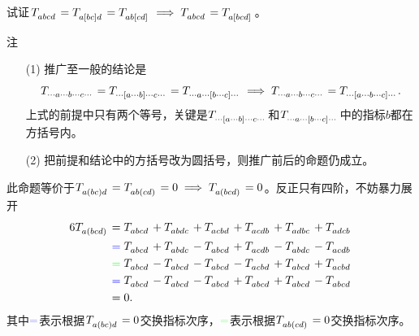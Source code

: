 \begin{xiti}
    \item 试证$\tensor{T}{_a_b_c_d}=\tensor{T}{_{a\left[bc\right]d}}=\tensor{T}{_{ab\left[cd\right]}}\implies \tensor{T}{_{abcd}}=\tensor{T}{_{a\left[bcd\right]}} $。
    
    \begin{yl}{注}
    	\begin{enumerate}
    		\item[(1)] 推广至一般的结论是
    		\begin{displaymath}
    		\tensor{T}{_{\cdots a \cdots b \cdots c \cdots}}=\tensor{T}{_{\cdots\left[a\cdots b\right]\cdots c\cdots}}=\tensor{T}{_{\cdots a\cdots \left[b\cdots c\right]\cdots}}\implies \tensor{T}{_{\cdots a \cdots b \cdots c \cdots}}=\tensor{T}{_{\cdots\left[a\cdots b\cdots c\right]\cdots}}.
    		\end{displaymath}
    		上式的前提中只有两个等号，关键是$\tensor{T}{_{\cdots\left[a\cdots b\right]\cdots c\cdots}}$和$\tensor{T}{_{\cdots a\cdots \left[b\cdots c\right]\cdots}} $中的指标$b$都在方括号内。
    		\item[(2)] 把前提和结论中的方括号改为圆括号，则推广前后的命题仍成立。
    	\end{enumerate}
    \end{yl}
    
    \begin{zm}
    	此命题等价于$\tensor{T}{_{a\left(bc\right)d}}=\tensor{T}{_{ab\left(cd\right)}}=0\implies \tensor{T}{_{a\left(bcd\right)}}=0 $。反正只有四阶，不妨暴力展开
    	\begin{align*}
    	6\tensor{T}{_a_{\left(bcd\right)}}=&\; \tensor{T}{_{abcd}}+\tensor{T}{_{abdc}}+\tensor{T}{_{acbd}}+\tensor{T}{_{acdb}}+\tensor{T}{_{adbc}}+\tensor{T}{_{adcb}}\\
    	{\color{blue}=}&\; \tensor{T}{_{abcd}}+\tensor{T}{_{abdc}}-\tensor{T}{_{abcd}}+\tensor{T}{_{acdb}}-\tensor{T}{_{abdc}}-\tensor{T}{_{acdb}}\\
    	{\color{green} =}&\; \tensor{T}{_{abcd}}-\tensor{T}{_{abcd}}-\tensor{T}{_{abcd}}-\tensor{T}{_{acbd}}+\tensor{T}{_{abcd}}+\tensor{T}{_{acbd}}\\
    	{\color{blue}=}&\; \tensor{T}{_{abcd}}-\tensor{T}{_{abcd}}-\tensor{T}{_{abcd}}+\tensor{T}{_{abcd}}+\tensor{T}{_{abcd}}-\tensor{T}{_{abcd}}\\
    	=&\; 0.
    	\end{align*}
    	其中${\color{blue}=} $表示根据$\tensor{T}{_{a\left(bc\right)d}}=0$交换指标次序，${\color{green}=}$表示根据$\tensor{T}{_{ab\left(cd\right)}}=0$交换指标次序。
    \end{zm}
    
    
    
    
\end{xiti}